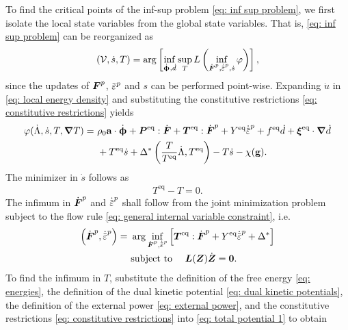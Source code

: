 To find the critical points of the inf-sup problem \eqref{eq: inf sup problem}, we first isolate the local state variables from the global state variables. That is, \eqref{eq: inf sup problem} can be reorganized as
\begin{align}
  \left( \mathcal{V}, \dot{s}, T \right) = \arg \left[ \inf_{\defrate, \dot{d}} \sup_T L\left( \inf_{\dot{\defgrad}^p, \epdot, \dot{s}} \varphi \right) \right],
\end{align}
since the updates of $\boldsymbol{F}^p$, $\ep$ and $s$ can be performed point-wise. Expanding $\dot{u}$ in \eqref{eq: local energy density} and substituting the constitutive restrictions \eqref{eq: constitutive restrictions} yields
\begin{equation}
  \begin{aligned}
    \varphi(\dot{\Lambda}, \dot{s}, T, \grad T) = & \ \rho_0\bta\cdot\defrate + \bfP^\text{eq}:\dot{\defgrad} + \bfT^\text{eq}:\dot{\defgrad}^p + Y^\text{eq}\epdot + f^\text{eq}\dot{d} + \bs{\xi}^\text{eq}\cdot\grad\dot{d} \\
                                                  & \ + T^\text{eq}\dot{s} + \Delta^*\left( \dfrac{T}{T^\text{eq}}\dot{\Lambda}, T^\text{eq} \right) - T\dot{s} - \chi(\btg).                                                  
  \end{aligned}
\end{equation}
The minimizer in $\dot{s}$ follows as
\begin{align}
  T^\text{eq} - T = 0.
\end{align}
The infimum in $\dot{\boldsymbol{F}}^p$ and $\epdot$ shall follow from the joint minimization problem subject to the flow rule \eqref{eq: general internal variable constraint}, i.e.
\begin{equation}
  \begin{aligned}
    \left( \dot{\defgrad}^p, \epdot \right) = & \ \arg\inf_{\dot{\defgrad}^p, \epdot} \left[ \bfT^\text{eq}:\dot{\defgrad}^p + Y^\text{eq}\epdot + \Delta^* \right] \\
                                              & \ \text{subject to }\quad \bfL(\bfZ)\dot{\bfZ} = \bs{0}.                                                            
  \end{aligned}
\end{equation}
To find the infimum in $T$, substitute the definition of the free energy \eqref{eq: energies}, the definition of the dual kinetic potential \eqref{eq: dual kinetic potentials}, the definition of the external power \eqref{eq: external power}, and the constitutive restrictions \eqref{eq: constitutive restrictions} into \eqref{eq: total potential 1} to obtain
